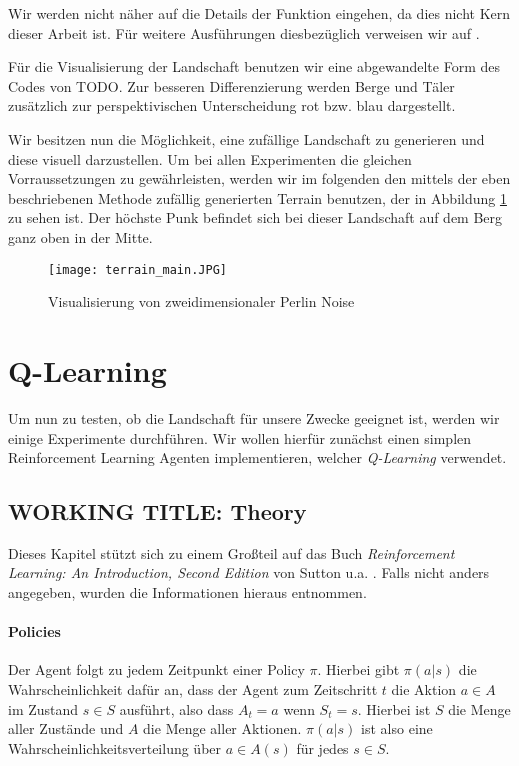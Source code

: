 Wir werden nicht näher auf die Details der Funktion eingehen, da dies nicht Kern dieser Arbeit ist. Für weitere Ausführungen diesbezüglich verweisen wir auf \cite{archer2011procedurally}.

Für die Visualisierung der Landschaft benutzen wir eine abgewandelte Form des Codes von TODO. Zur besseren Differenzierung werden Berge und Täler zusätzlich zur perspektivischen Unterscheidung rot bzw. blau dargestellt.

\smallspace

Wir besitzen nun die Möglichkeit, eine zufällige Landschaft zu generieren und diese visuell darzustellen. Um bei allen Experimenten die gleichen Vorraussetzungen zu gewährleisten, werden wir im folgenden den mittels der eben beschriebenen Methode zufällig generierten Terrain benutzen, der in Abbildung \ref{img:terrainMain} zu sehen ist. Der höchste Punk befindet sich bei dieser Landschaft auf dem Berg ganz oben in der Mitte.

\begin{figure}[h]
    \centering
    \texttt{[image: terrain\_main.JPG]}
    \caption{Visualisierung von zweidimensionaler Perlin Noise} \label{img:terrainMain}
\end{figure}

\section{Q-Learning}

Um nun zu testen, ob die Landschaft für unsere Zwecke geeignet ist, werden wir einige Experimente durchführen. Wir wollen hierfür zunächst einen simplen Reinforcement Learning Agenten implementieren, welcher \textit{Q-Learning} verwendet.

\subsection{WORKING TITLE: Theory}

Dieses Kapitel stützt sich zu einem Großteil auf das Buch \textit{Reinforcement Learning: An Introduction, Second Edition} von Sutton u.a. \cite{06_sutton2018reinforcement}. Falls nicht anders angegeben, wurden die Informationen hieraus entnommen.

\paragraph{Policies}
Der Agent folgt zu jedem Zeitpunkt einer Policy $ \pi $. Hierbei gibt $ \pi(a|s) $ die Wahrscheinlichkeit dafür an, dass der Agent zum Zeitschritt $ t $ die Aktion $ a \in A $ im Zustand $ s \in S $ ausführt, also dass $ A_t = a $ wenn $ S_t = s $. Hierbei ist $ S $ die Menge aller Zustände und $ A $ die Menge aller Aktionen. $ \pi(a|s) $ ist also eine Wahrscheinlichkeitsverteilung über $ a \in A(s) $ für jedes $ s \in S $.

